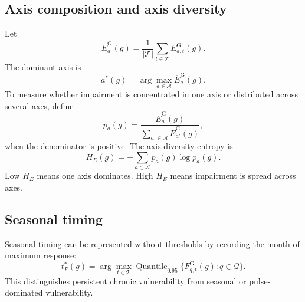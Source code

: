 \documentclass[11pt]{article}
\begin{document}
\subsection{Axis composition and axis diversity}
Let
\begin{equation}
\overline{E}_a^{\mathrm{G}}(g)=\frac{1}{|\mathcal{T}|}\sum_{t\in\mathcal{T}}E_{a,t}^{\mathrm{G}}(g).
\end{equation}
The dominant axis is
\begin{equation}
a^*(g)=\arg\max_{a\in\mathcal{A}}\overline{E}_a^{\mathrm{G}}(g).
\end{equation}
To measure whether impairment is concentrated in one axis or distributed across several axes, define
\begin{equation}
p_a(g)=\frac{\overline{E}_a^{\mathrm{G}}(g)}{\sum_{a'\in\mathcal{A}}\overline{E}_{a'}^{\mathrm{G}}(g)},
\end{equation}
when the denominator is positive. The axis-diversity entropy is
\begin{equation}
H_E(g)=-\sum_{a\in\mathcal{A}}p_a(g)\log p_a(g).
\end{equation}
Low $H_E$ means one axis dominates. High $H_E$ means impairment is spread across axes.

\subsection{Seasonal timing}
Seasonal timing can be represented without thresholds by recording the month of maximum response:
\begin{equation}
t^*_F(g)=\arg\max_{t\in\mathcal{T}}\operatorname{Quantile}_{0.95}
\{F_{q,t}^{\mathrm{G}}(g):q\in\mathcal{Q}\}.
\end{equation}
This distinguishes persistent chronic vulnerability from seasonal or pulse-dominated vulnerability.
\end{document}
